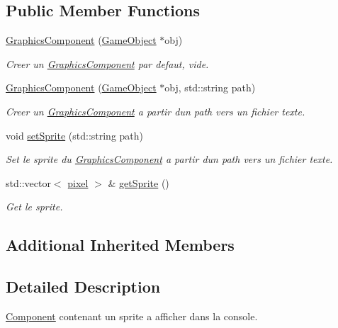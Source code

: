 \subsection*{Public Member Functions}
\begin{DoxyCompactItemize}
\item 
\hypertarget{class_graphics_component_ab1b30f1e588303b117a932c49bddaba9}{}\label{class_graphics_component_ab1b30f1e588303b117a932c49bddaba9} 
\hyperlink{class_graphics_component_ab1b30f1e588303b117a932c49bddaba9}{Graphics\+Component} (\hyperlink{class_game_object}{Game\+Object} $\ast$obj)
\begin{DoxyCompactList}\small\item\em Creer un \hyperlink{class_graphics_component}{Graphics\+Component} par defaut, vide. \end{DoxyCompactList}\item 
\hyperlink{class_graphics_component_a342ca4852ca1bd06471cd2db0614fdab}{Graphics\+Component} (\hyperlink{class_game_object}{Game\+Object} $\ast$obj, std\+::string path)
\begin{DoxyCompactList}\small\item\em Creer un \hyperlink{class_graphics_component}{Graphics\+Component} a partir d\textquotesingle{}un path vers un fichier texte. \end{DoxyCompactList}\item 
void \hyperlink{class_graphics_component_ab3e309ee0a8dcbc1b927d38bf2e1d8c9}{set\+Sprite} (std\+::string path)
\begin{DoxyCompactList}\small\item\em Set le sprite du \hyperlink{class_graphics_component}{Graphics\+Component} a partir d\textquotesingle{}un path vers un fichier texte. \end{DoxyCompactList}\item 
std\+::vector$<$ \hyperlink{structpixel}{pixel} $>$ \& \hyperlink{class_graphics_component_aa88d6da1d4cceb7bf2b16c0419312517}{get\+Sprite} ()
\begin{DoxyCompactList}\small\item\em Get le sprite. \end{DoxyCompactList}\end{DoxyCompactItemize}
\subsection*{Additional Inherited Members}


\subsection{Detailed Description}
\hyperlink{class_component}{Component} contenant un sprite a afficher dans la console. 


